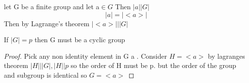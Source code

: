 \documentclass[11pt]{article}
\theoremstyle{definition}  %
\newcommand{\block}[2]{\begin{tcolorbox}[title={#1}]{#2}\end{tcolorbox}}
\begin{document}
\block{Colloary}{
let G be a finite group and let a$\in G$ Then $|a||G|$ \\
\[
  |a|=|<a>|
\]
Then by Lagrange's theorem $|<a>|||G|$
}
\block{Colloray}{

If $|G|=p$ then G must be a cyclic group
}
\begin{proof}
  Pick any non identity element in G a . Consider $H=<a>$ by lagranges theorem $|H|||G|, |H||p$ so the order of H must be p. but the order of the group and subgroup is identical so $G=<a>$
\end{proof}
\end{document}
